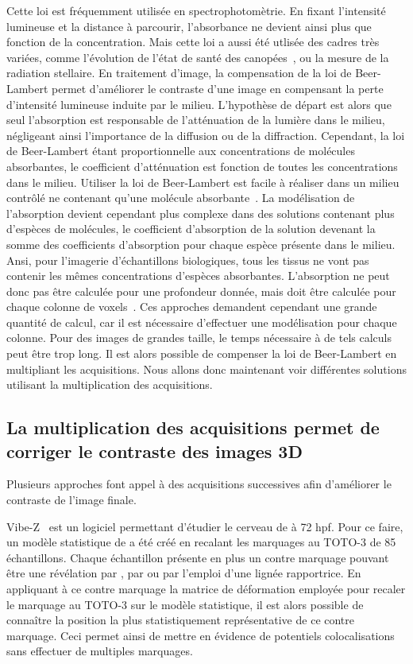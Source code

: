 \documentclass[\main/main.tex]{subfiles}
\begin{document}
%
Cette loi est fréquemment utilisée en spectrophotomètrie. En fixant l'intensité lumineuse et la distance à parcourir, l'absorbance ne devient ainsi plus que fonction de la concentration.
%
Mais cette loi a aussi été utlisée des cadres très variées, comme l'évolution de l'état de santé des canopées~\cite{demattos_2020, liu_2020a}, ou la mesure de la radiation stellaire.
%
En traitement d'image, la compensation de la loi de Beer-Lambert permet d'améliorer le contraste d'une image en compensant la perte d'intensité lumineuse induite par le milieu. L'hypothèse de départ est alors que seul l'absorption est responsable de l'atténuation de la lumière dans le milieu,
négligeant ainsi l'importance de la diffusion ou de la diffraction.
%
Cependant, la loi de Beer-Lambert étant proportionnelle aux concentrations de molécules absorbantes, le coefficient d'atténuation est fonction de toutes les concentrations dans le milieu.
%
Utiliser la loi de Beer-Lambert est facile à réaliser dans un milieu contrôlé ne contenant qu'une molécule absorbante~\cite{mikulewitsch_2018}. La modélisation de l'absorption devient cependant plus complexe dans des solutions contenant plus d'espèces de molécules, le coefficient d'absorption de la solution devenant la somme des coefficients d'absorption pour chaque espèce présente dans le milieu.
%
Ansi, pour l'imagerie d'échantillons biologiques, tous les tissus ne vont pas contenir les mêmes concentrations d'espèces absorbantes. L'absorption ne peut donc pas être calculée pour une profondeur donnée, mais doit être calculée pour chaque colonne de voxels~\cite{ohser_2020,nylk_2018,parker_2020}.
%
Ces approches demandent cependant une grande quantité de calcul,
car il est nécessaire d'effectuer une modélisation pour chaque colonne. Pour des images de grandes taille, le temps nécessaire à de tels calculs peut être trop long.
%
Il est alors possible de compenser la loi de Beer-Lambert en multipliant les acquisitions.
%
Nous allons donc maintenant voir différentes solutions utilisant la multiplication des acquisitions.

\subsection{La multiplication des acquisitions permet de corriger le contraste des images 3D}

Plusieurs approches font appel à des acquisitions successives afin d'améliorer le contraste de l'image finale.
%

%
Vibe-Z~\cite{ronneberger_2015} est un logiciel permettant d'étudier le cerveau de \pz{} à 72 hpf.
%
Pour ce faire, un modèle statistique de \pz{} a été créé en recalant les marquages au TOTO-3 de 85 échantillons.
%
Chaque échantillon présente en plus un contre marquage pouvant être une révélation par \fish{}, par \ihcie{} ou par l'emploi d'une lignée rapportrice. 
%
En appliquant à ce contre marquage la matrice de déformation employée pour recaler le marquage au TOTO-3 sur le modèle statistique, il est alors possible de connaître la position la plus statistiquement représentative de ce contre marquage.
%
Ceci permet ainsi de mettre en évidence de potentiels colocalisations sans effectuer de multiples marquages.
\end{document}
